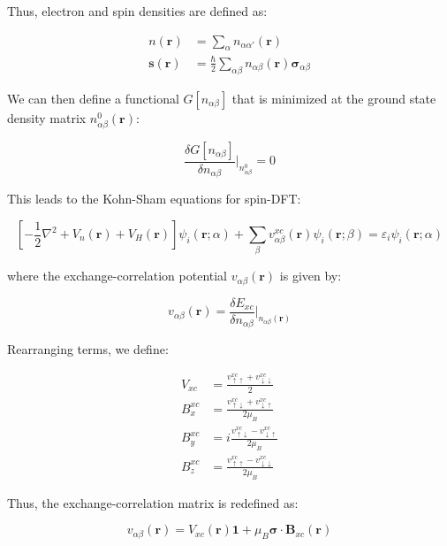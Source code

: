 Thus, electron and spin densities are defined as:

\begin{align}
	n(\mathbf{r}) &= \sum_{\alpha} n_{\alpha \alpha'} (\mathbf{r}) \\
	\mathbf{s} (\mathbf{r}) &= \frac{\hbar}{2} \sum_{\alpha \beta} n_{\alpha \beta} (\mathbf{r}) \mathbf{\sigma}_{\alpha \beta}
\end{align}

We can then define a functional \( G[n_{\alpha \beta}] \) that is minimized at the ground state density matrix \( n_{\alpha \beta}^{0} (\mathbf{r}) \):

\begin{equation}
	\frac{\delta G[n_{\alpha \beta}]}{\delta n_{\alpha \beta}} \Bigg|_{n_{\alpha \beta}^{0}} = 0
\end{equation}

This leads to the Kohn-Sham equations for spin-DFT:

\begin{equation}
	\left[-\frac{1}{2} \nabla^{2} + V_{n}(\mathbf{r}) + V_{H}(\mathbf{r}) \right] \psi_{i}(\mathbf{r};\alpha) + \sum_{\beta} v_{\alpha \beta}^{xc} (\mathbf{r}) \psi_{i} (\mathbf{r}; \beta) = \varepsilon_{i} \psi_{i}(\mathbf{r};\alpha)
\end{equation}

where the exchange-correlation potential \( v_{\alpha \beta} (\mathbf{r}) \) is given by:

\begin{equation}
	v_{\alpha \beta} (\mathbf{r}) = \frac{\delta E_{xc}}{\delta n_{\alpha \beta}} \Bigg|_{n_{\alpha \beta} (\mathbf{r})}
\end{equation}

Rearranging terms, we define:

\begin{align*}
	V_{xc} &= \frac{v_{\uparrow \uparrow}^{xc} + v_{\downarrow \downarrow}^{xc}}{2} \\
	B_{x}^{xc} &= \frac{v_{\uparrow \downarrow}^{xc} + v_{\downarrow \uparrow}^{xc}}{2 \mu_{B}} \\
	B_{y}^{xc} &= i \frac{v_{\uparrow \downarrow}^{xc} - v_{\downarrow \uparrow}^{xc}}{2 \mu_{B}} \\
	B_{z}^{xc} &= \frac{v_{\uparrow \uparrow}^{xc} - v_{\downarrow \downarrow}^{xc}}{2 \mu_{B}}
\end{align*}

Thus, the exchange-correlation matrix is redefined as:

\begin{equation}
	v_{\alpha \beta} (\mathbf{r}) = V_{xc} (\mathbf{r}) \mathbf{1} + \mu_{B} \mathbf{\sigma} \cdot \mathbf{B}_{xc}(\mathbf{r})
\end{equation}

